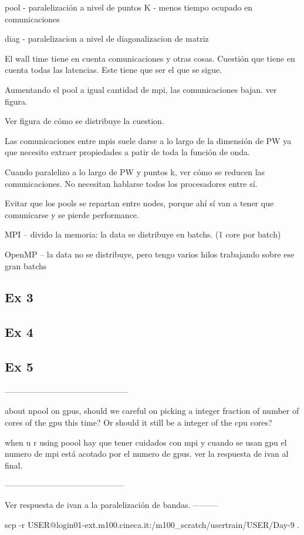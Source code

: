   pool - paralelización a nivel de puntos K - menos tiempo ocupado en comunicaciones

  diag - paralelizacion a nivel de diagonalizacion de matriz


  El wall time tiene en cuenta comunicaciones y otras cosas. Cuestión que tiene en cuenta todas las latencias. Este tiene que ser el que se sigue.


  Aumentando el pool a igual cantidad de mpi, las comunicaciones bajan. ver figura.

  Ver figura de cómo se distribuye la cuestion.

  Las comunicaciones entre mpis suele darse a lo largo de la dimensión de PW ya que necesito extraer propiedades a patir de toda la función de onda.

  Cuando paralelizo a lo largo de PW y puntos k, ver cómo se reducen las comunicaciones. No necesitan hablarse todos los procesadores entre sí.

  Evitar que los pools se repartan entre nodes, porque ahí sí van a tener que comunicarse y se pierde performance.

  MPI  -- divido la memoria: la data se distribuye en batchs. (1 core por batch)

  OpenMP -- la data no se distribuye, pero tengo varios hilos trabajando sobre ese gran batchs

\subsection{Ex 3}


\subsection{Ex 4}


\subsection{Ex 5}

---------------------------------------------

  about npool on gpus, should we careful on picking a integer fraction of number of cores of the gpu this time? Or should it still be a integer of the cpu cores?

  when u r using poool hay que tener cuidados con mpi y cuando se usan gpu el numero de mpi está acotado por el numero de gpus. ver la respuesta de ivan al final.



--------------------------------------------

  Ver respuesta de ivan a la paralelización de bandas.
---------


scp -r USER@login01-ext.m100.cineca.it:/m100_scratch/usertrain/USER/Day-9 . 

